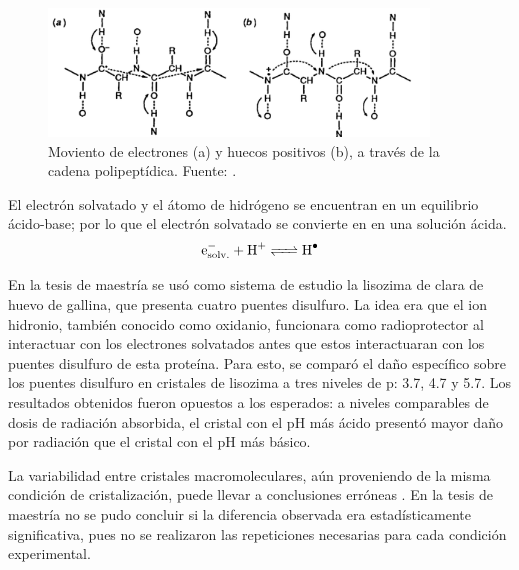 \begin{figure}[h]
	\centering
	\includegraphics[width=0.9\textwidth]{imgs/symons92.png}
	\caption[Movimiento de cargas en la cadena polipeptídica]{Moviento de electrones (a) y huecos positivos (b), a través de la cadena polipeptídica. Fuente: \cite{Symons1997}.}
\end{figure}

El electrón solvatado y el átomo de hidrógeno se encuentran en un equilibrio ácido-base; por lo que el electrón solvatado se convierte en  en una solución ácida. %
\begin{equation}
\ce{e^{-}_{solv.} + H^{+} <=> H^{.}}
\end{equation}

En la tesis de maestría se usó como sistema de estudio la lisozima de clara de huevo de gallina, que presenta cuatro puentes disulfuro. La idea era que el ion hidronio, también conocido como oxidanio, funcionara como radioprotector al interactuar con los electrones solvatados antes que estos interactuaran con los puentes disulfuro de esta proteína. Para esto, se comparó el daño específico sobre los puentes disulfuro en cristales de lisozima a tres niveles de p: \num{3.7}, \num{4.7} y \num{5.7}. Los resultados obtenidos fueron opuestos a los esperados: a niveles comparables de dosis de radiación absorbida, el cristal con el pH más ácido presentó mayor daño por radiación que el cristal con el pH más básico.

La variabilidad entre cristales macromoleculares, aún proveniendo de la misma condición de cristalización, puede llevar a conclusiones erróneas . En la tesis de maestría no se pudo concluir si la diferencia observada era estadísticamente significativa, pues no se realizaron las repeticiones necesarias para cada condición experimental.


